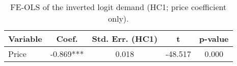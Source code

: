 \begin{table}[H]
\centering
\caption{FE-OLS of the inverted logit demand (HC1; price coefficient only).}
\label{tab:q10_fe_ols_price}
\begin{tabular}{lcccc}
\toprule
Variable & Coef. & Std. Err. (HC1) & t & p-value \\
\midrule
Price & -0.869*** & 0.018 & -48.517 & 0.000 \\
\bottomrule
\end{tabular}
\end{table}
